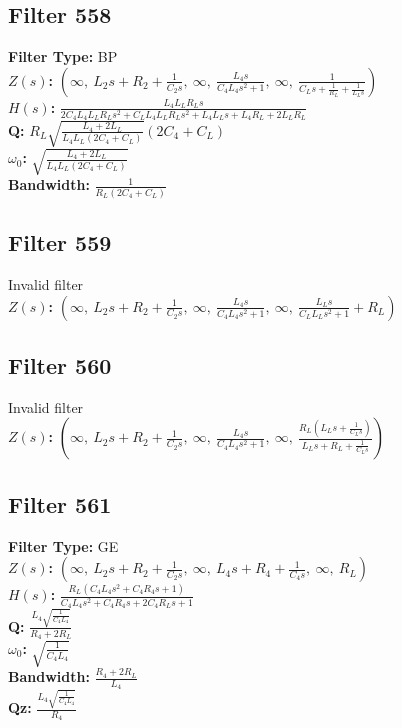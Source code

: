 \documentclass{article}
\begin{document}
\subsection*{Filter 558}
\textbf{Filter Type:} BP \\ 
\textbf{$Z(s)$:} $\left( \infty, \  L_{2} s + R_{2} + \frac{1}{C_{2} s}, \  \infty, \  \frac{L_{4} s}{C_{4} L_{4} s^{2} + 1}, \  \infty, \  \frac{1}{C_{L} s + \frac{1}{R_{L}} + \frac{1}{L_{L} s}}\right)$ \\ 
\textbf{$H(s)$:} $\frac{L_{4} L_{L} R_{L} s}{2 C_{4} L_{4} L_{L} R_{L} s^{2} + C_{L} L_{4} L_{L} R_{L} s^{2} + L_{4} L_{L} s + L_{4} R_{L} + 2 L_{L} R_{L}}$ \\ 
\textbf{Q:} $R_{L} \sqrt{\frac{L_{4} + 2 L_{L}}{L_{4} L_{L} \left(2 C_{4} + C_{L}\right)}} \left(2 C_{4} + C_{L}\right)$ \\ 
\textbf{$\omega_0$:} $\sqrt{\frac{L_{4} + 2 L_{L}}{L_{4} L_{L} \left(2 C_{4} + C_{L}\right)}}$ \\ 
\textbf{Bandwidth:} $\frac{1}{R_{L} \left(2 C_{4} + C_{L}\right)}$ \\ 
\subsection*{Filter 559}
Invalid filter \\ 
\textbf{$Z(s)$:} $\left( \infty, \  L_{2} s + R_{2} + \frac{1}{C_{2} s}, \  \infty, \  \frac{L_{4} s}{C_{4} L_{4} s^{2} + 1}, \  \infty, \  \frac{L_{L} s}{C_{L} L_{L} s^{2} + 1} + R_{L}\right)$ \\ 
\subsection*{Filter 560}
Invalid filter \\ 
\textbf{$Z(s)$:} $\left( \infty, \  L_{2} s + R_{2} + \frac{1}{C_{2} s}, \  \infty, \  \frac{L_{4} s}{C_{4} L_{4} s^{2} + 1}, \  \infty, \  \frac{R_{L} \left(L_{L} s + \frac{1}{C_{L} s}\right)}{L_{L} s + R_{L} + \frac{1}{C_{L} s}}\right)$ \\ 
\subsection*{Filter 561}
\textbf{Filter Type:} GE \\ 
\textbf{$Z(s)$:} $\left( \infty, \  L_{2} s + R_{2} + \frac{1}{C_{2} s}, \  \infty, \  L_{4} s + R_{4} + \frac{1}{C_{4} s}, \  \infty, \  R_{L}\right)$ \\ 
\textbf{$H(s)$:} $\frac{R_{L} \left(C_{4} L_{4} s^{2} + C_{4} R_{4} s + 1\right)}{C_{4} L_{4} s^{2} + C_{4} R_{4} s + 2 C_{4} R_{L} s + 1}$ \\ 
\textbf{Q:} $\frac{L_{4} \sqrt{\frac{1}{C_{4} L_{4}}}}{R_{4} + 2 R_{L}}$ \\ 
\textbf{$\omega_0$:} $\sqrt{\frac{1}{C_{4} L_{4}}}$ \\ 
\textbf{Bandwidth:} $\frac{R_{4} + 2 R_{L}}{L_{4}}$ \\ 
\textbf{Qz:} $\frac{L_{4} \sqrt{\frac{1}{C_{4} L_{4}}}}{R_{4}}$ \\ 
\end{document}
